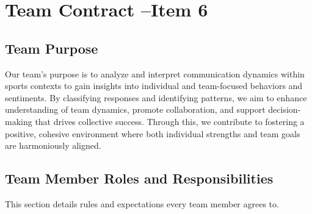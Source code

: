 \documentclass[titlepage]{article}
\begin{document}
\section{Team Contract --Item 6}

\subsection{Team Purpose}
Our team's purpose is to analyze and interpret communication dynamics
within sports contexts to gain insights into individual and
team-focused behaviors and sentiments. By classifying responses and
identifying patterns, we aim to enhance understanding of team
dynamics, promote collaboration, and support decision-making that
drives collective success. Through this, we contribute to fostering a
positive, cohesive environment where both individual strengths and
team goals are harmoniously aligned.

\subsection{Team Member Roles and Responsibilities}
This section details rules and expectations every team member agrees to.
\end{document}
